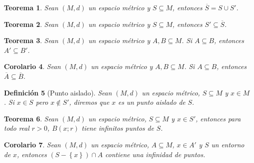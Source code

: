 \documentclass[oneside]{book} %
\theoremstyle{Teorema}
\newtheorem{Definicion}{Definición}[chapter]
\newtheorem{Teorema}[Definicion]{Teorema}
\newtheorem{Corolario}[Definicion]{Corolario}
\theoremstyle{Ejemplos}
\theoremstyle{[Obs]}
\renewcommand{\{}{\left\lbrace} %
\renewcommand{\}}{\right\rbrace} %
\renewcommand{\u}{\cup} %
\newcommand{\n}{\cap} %
\renewcommand{\sc}{\subseteq} %
\begin{document}
			\begin{Teorema}
				
				Sean $(M, d)$ un espacio métrico y $S \sc M$, entonces $\overline{S} = S \u S'$. \\

			\end{Teorema}

			\begin{Teorema}
				
				Sean $(M, d)$ un espacio métrico y $S \sc M$, entonces $S' \sc \overline{S}$. \\

			\end{Teorema}

			\begin{Teorema}
				
				Sean $(M, d)$ un espacio métrico y $A, B \sc M$. Si $A \sc B$, entonces $A' \sc B'$. \\

			\end{Teorema}

			\begin{Corolario}
				
				Sean $(M, d)$ un espacio métrico y $A, B \sc M$. Si $A \sc B$, entonces $\overline{A} \sc \overline{B}$. \\

			\end{Corolario}

			\begin{Definicion}[Punto aislado]
				
				Sean $(M, d)$ un espacio métrico, $S \sc M$ y $x \in M$. Si $x \in S$ pero $x \notin S'$, diremos que $x$ es un punto aislado de $S$. \\

			\end{Definicion}

			\begin{Teorema}
				
				Sean $(M, d)$ un espacio métrico, $S \sc M$ y $x \in S'$, entonces para todo real $r > 0$, $B(x;r)$ tiene infinitos puntos de $S$. \\

			\end{Teorema}

			\begin{Corolario}
				
				Sean $(M, d)$ un espacio métrico, $A \sc M$, $x \in A'$ y $S$ un entorno de $x$, entonces $(S - \{ x \}) \n A$ contiene una infinidad de puntos. \\ 

			\end{Corolario}
\end{document}
